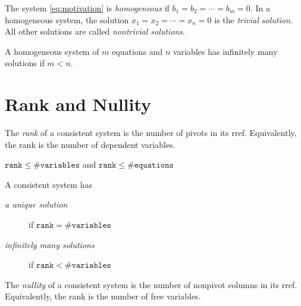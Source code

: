 \documentclass[12pt]{article}
\begin{document}
\begin{definition}
  The system \eqref{eq:motivation} is \emph{homogeneous} if
  $b_1=b_2=\dotsb=b_m=0$. In a homogeneous system, the solution
  $x_1=x_2=\dotsb=x_n=0$ is the \emph{trivial solution}. All other solutions are
  called \emph{nontrivial solutions}.
\end{definition}

\begin{samepage}
  \begin{thm}
    A homogeneous system of $m$ equations and $n$ variables has infinitely many
    solutions if $m<n$.
  \end{thm}
\end{samepage}


\section{Rank and Nullity}

\begin{samepage}
  \begin{definition}
    The \emph{rank} of a consistent system is the number of pivots in its
    rref. Equivalently, the rank is the number of dependent variables.
  \end{definition}
\end{samepage}


\begin{samepage}
  \begin{thm}
    $\mathtt{rank}\leq\#\mathtt{variables}$ and
    $\mathtt{rank}\leq\#\mathtt{equations}$
  \end{thm}
\end{samepage}


\begin{samepage}
  \begin{thm}
    A consistent system has
    \begin{description}
    \item[\emph{a unique solution}] if $\mathtt{rank}=\#\mathtt{variables}$
    \item[\emph{infinitely many solutions}] if
      $\mathtt{rank}<\#\mathtt{variables}$
    \end{description}
  \end{thm}
\end{samepage}


\begin{samepage}
  \begin{definition}
    The \emph{nullity} of a consistent system is the number of nonpivot columns
    in its rref. Equivalently, the rank is the number of free variables.
  \end{definition}
\end{samepage}
\end{document}
